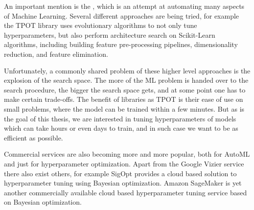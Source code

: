An important mention is the \cite{automl}, which is an attempt at automating many aspects of Machine Learning. Several different approaches are being tried, for example the TPOT \citep{tpot} library uses evolutionary algorithms to not only tune hyperparameters, but also perform architecture search on Scikit-Learn algorithms, including building feature pre-processing pipelines, dimensionality reduction, and feature elimination.

Unfortunately, a commonly shared problem of these higher level approaches is the explosion of the search space. The more of the ML problem is handed over to the search procedure, the bigger the search space gets, and at some point one has to make certain trade-offs. The benefit of libraries as TPOT is their ease of use on small problems, where the model can be trained within a few minutes. But as is the goal of this thesis, we are interested in tuning hyperparameters of models which can take hours or even days to train, and in such case we want to be as efficient as possible.

Commercial services are also becoming more and more popular, both for AutoML and just for hyperparameter optimization. Apart from the Google Vizier service \citep{google-vizier} there also exist others, for example SigOpt \citep{sigopt} provides a cloud based solution to hyperparameter tuning using Bayesian optimization. Amazon SageMaker \citep{amazon-sagemaker} is yet another commercially available cloud based hyperparameter tuning service based on Bayesian optimization.



